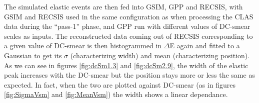 The simulated elastic events are then fed into GSIM, GPP and RECSIS, with GSIM and RECSIS used in the same configuration as when processing the CLAS data 
during the ``pass-1'' phase, and GPP run with different values of DC-smear scales as inputs. The reconstructed data coming out of RECSIS corresponding to 
a given value of DC-smear is then histogrammed in $\Delta$E again and fitted to a Gaussian to get its $\sigma$ (characterizing width) and mean (characterizing position). As we can see in figures \ref{fig:dcSm1.3} and \ref{fig:dcSm2.9}, %
the width of the elastic peak increases with the DC-smear but the position stays more or less the same as expected. In fact, when the two are plotted 
against DC-smear (as in figures \ref{fig:SigmaVsm} and \ref{fig:MeanVsm}) %
the width shows a linear dependance.



  %


